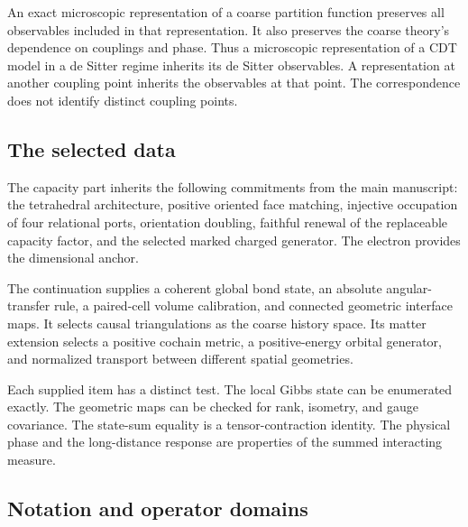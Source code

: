 An exact microscopic representation of a coarse partition function preserves all observables included in that representation. It also preserves the coarse theory's dependence on couplings and phase. Thus a microscopic representation of a CDT model in a de Sitter regime inherits its de Sitter observables. A representation at another coupling point inherits the observables at that point. The correspondence does not identify distinct coupling points.

\subsection{The selected data}

The capacity part inherits the following commitments from the main manuscript: the tetrahedral architecture, positive oriented face matching, injective occupation of four relational ports, orientation doubling, faithful renewal of the replaceable capacity factor, and the selected marked charged generator. The electron provides the dimensional anchor.

The continuation supplies a coherent global bond state, an absolute angular-transfer rule, a paired-cell volume calibration, and connected geometric interface maps. It selects causal triangulations as the coarse history space. Its matter extension selects a positive cochain metric, a positive-energy orbital generator, and normalized transport between different spatial geometries.

Each supplied item has a distinct test. The local Gibbs state can be enumerated exactly. The geometric maps can be checked for rank, isometry, and gauge covariance. The state-sum equality is a tensor-contraction identity. The physical phase and the long-distance response are properties of the summed interacting measure.

\subsection{Notation and operator domains}

